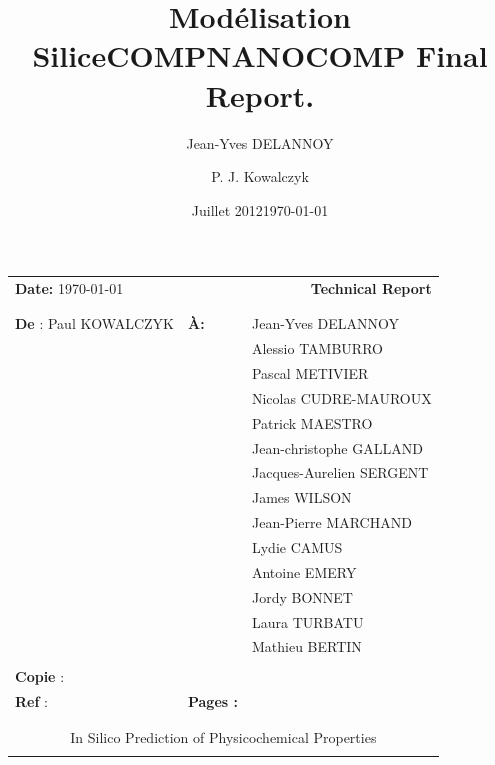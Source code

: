 \documentclass[10pt, letter]{article}
\title{Modélisation Silice}
\date{Juillet 2012}
\author{Jean-Yves DELANNOY}
\renewcommand{\=}{\, =\, }
\newcommand{\+}{\, +\, }
\renewcommand{\-}{\, -\, }
\begin{document}
\title{\textbf{COMPNANOCOMP Final Report.}}


\author{P. J. Kowalczyk}
\date{\today}

\vspace*{1cm}
\hspace*{-1cm}\begin{tabular}{p{}p{}p{}}
{\bf Date:} \today & \multicolumn{2}{r}{{\huge \bf{Technical Report }}}\\
\\
\hline
\\
{\bf De} : Paul KOWALCZYK  & \bf{\`A:} & Jean-Yves DELANNOY \\
&& Alessio TAMBURRO \\
&& Pascal METIVIER \\
&& Nicolas CUDRE-MAUROUX \\
&& Patrick MAESTRO \\
&& Jean-christophe GALLAND \\
&& Jacques-Aurelien SERGENT \\
&& James WILSON \\
&& Jean-Pierre MARCHAND \\
&& Lydie CAMUS \\
&& Antoine EMERY \\
&& Jordy BONNET \\
&& Laura TURBATU \\
&& Mathieu BERTIN \\

 \\
{\bf Copie} :   \\
{\bf Ref} :&  {\bf Pages : }  & \pageref{LastPage} \\
\\
\hline
\\
\multicolumn{3}{c}{\LARGE In Silico Prediction of Physicochemical Properties} \\
\\
\hline
\end{tabular}
%
\vspace*{2cm}
\end{document}

